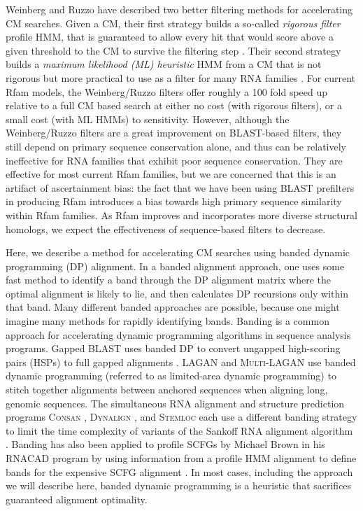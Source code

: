 \documentclass[11pt]{article}
\begin{document}
Weinberg and Ruzzo have described two better filtering methods for
accelerating CM searches. Given a CM, their first strategy builds a
so-called \emph{rigorous filter} profile HMM, that is guaranteed to
allow every hit that would score above a given threshold to the CM to
survive the filtering step \cite{Weinberg04, Weinberg04b}. Their
second strategy builds a \emph{maximum likelihood (ML) heuristic} HMM
from a CM that is not rigorous but more practical to use as a filter
for many RNA families \cite{Weinberg05}. For current Rfam models, the
Weinberg/Ruzzo filters offer roughly a 100 fold speed up relative to a
full CM based search at either no cost (with rigorous filters), or a
small cost (with ML HMMs) to sensitivity. However, although the
Weinberg/Ruzzo filters are a great improvement on BLAST-based filters,
they still depend on primary sequence conservation alone, and thus can
be relatively ineffective for RNA families that exhibit poor sequence
conservation. They are effective for most current Rfam families, but
we are concerned that this is an artifact of ascertainment bias: the
fact that we have been using BLAST prefilters in producing Rfam
introduces a bias towards high primary sequence similarity within Rfam
families. As Rfam improves and incorporates more diverse structural
homologs, we expect the effectiveness of sequence-based filters to
decrease. 

Here, we describe a method for accelerating CM searches using banded
dynamic programming (DP) alignment.  In a banded alignment approach,
one uses some fast method to identify a band through the DP alignment
matrix where the optimal alignment is likely to lie, and then
calculates DP recursions only within that band. Many different banded
approaches are possible, because one might imagine many methods for
rapidly identifying bands. Banding is a common approach for
accelerating dynamic programming algorithms in sequence analysis
programs. Gapped \textsc{BLAST} uses banded DP to convert ungapped
high-scoring pairs (HSPs) to full gapped alignments
\cite{Altschul90,XXX}.  \textsc{LAGAN} and \textsc{Multi-LAGAN} use
banded dynamic programming (referred to as limited-area dynamic
programming) to stitch together alignments between anchored sequences
when aligning long, genomic sequences. The simultaneous RNA alignment
and structure prediction programs \textsc{Consan} \cite{Dowell06},
\textsc{Dynalign} \cite{Mathews05}, and \textsc{Stemloc}
\cite{Holmes05} each use a different banding strategy to limit the
time complexity of variants of the Sankoff RNA alignment algorithm
\cite{Sankoff85}. Banding has also been applied to profile SCFGs by
Michael Brown in his \textsc{RNACAD} program by using information from
a profile HMM alignment to define bands for the expensive SCFG
alignment \cite{Brown00}.  In most cases, including the approach we
will describe here, banded dynamic programming is a heuristic that
sacrifices guaranteed alignment optimality.
\end{document}
